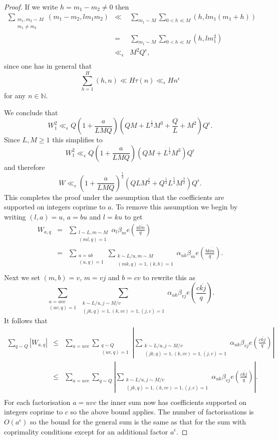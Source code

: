 \documentclass[12pt]{article}
\newcommand{\N}{\mathbb N}
\newcommand{\twosum}[2]{\sum_{\substack{#1\\#2}}}
\begin{document}
\begin{proof}
If we write $h=m_1-m_2\ne 0$ then 
\begin{eqnarray*}
\twosum{m_1,m_2\sim M}{m_1\ne m_2}(m_1-m_2,lm_1m_2)&\ll&\sum_{m_1\sim M}\sum_{0<h\ll M}(h,lm_1(m_1+h))\\
&=&\sum_{m_1\sim M}\sum_{0<h\ll M}(h,lm_1^2)\\
&\ll_\epsilon &M^2Q^\epsilon,\\
\end{eqnarray*}
since one has in general that
$$\sum_{h=1}^H(h,n)\ll H\tau(n)\ll_\epsilon Hn^{\epsilon}$$
for any $n\in\N$.

We conclude that 
$$W_1^2\ll_\epsilon Q(1+\frac{a}{LMQ})(QM+L^{\frac12}M^3+\frac{Q}{L}+M^2)Q^\epsilon.$$
Since $L,M\geq 1$ this simplifies to 
$$W_1^2\ll_\epsilon Q(1+\frac{a}{LMQ})(QM+L^{\frac12}M^3)Q^\epsilon$$
and therefore 
$$W\ll_\epsilon (1+\frac{a}{LMQ})^{\frac12}(QLM^{\frac12}+Q^{\frac12}L^{\frac54}M^{\frac32})Q^\epsilon.$$
This completes the proof under the assumption that the coefficients
are supported on integers coprime to $a$.  To remove this assumption we begin by writing $(l,a)=u$, $a=bu$ and $l=ku$ to get 
\begin{eqnarray*}
W_{a,q}&=&\twosum{l\sim L,m\sim M}{(ml,q)=1}\alpha_l\beta_me(\frac{a\overline{lm}}{q})\\
&=&\twosum{a=ub}{(u,q)=1}\twosum{k\sim L/u,m\sim M}{(mk,q)=1,(k,b)=1}\alpha_{uk}\beta_me(\frac{b\overline{km}}{q}).\\
\end{eqnarray*}
Next we set $(m,b)=v$, $m=vj$ and $b=cv$ to rewrite this as 
$$\twosum{a=uvc}{(uv,q)=1}\twosum{k\sim L/u,j\sim M/v}{(jk,q)=1,(k,vc)=1,(j,c)=1}\alpha_{uk}\beta_{vj}e(\frac{c\overline{kj}}{q}).$$
It follows that 
\begin{eqnarray*}
\sum_{q\sim Q}|W_{a,q}|&\leq &\sum_{a=uvc}\twosum{q\sim Q}{(uv,q)=1}\left|\twosum{k\sim L/u,j\sim M/v}{(jk,q)=1,(k,vc)=1,(j,c)=1}\alpha_{uk}\beta_{vj}e(\frac{c\overline{kj}}{q})\right|\\
&\leq &\sum_{a=uvc}\sum_{q\sim Q}\left|\twosum{k\sim L/u,j\sim M/v}{(jk,q)=1,(k,vc)=1,(j,c)=1}\alpha_{uk}\beta_{vj}e(\frac{c\overline{kj}}{q})\right|.\\
\end{eqnarray*}
For each factorisation $a=uvc$ the inner sum now has coefficients supported on integers coprime to $c$ so the above bound applies.  The number of factorisations is $O(a^\epsilon)$ so the bound for the general sum is the same as that for the sum with coprimality conditions except for an additional factor $a^\epsilon$.
\end{proof}
\end{document}
